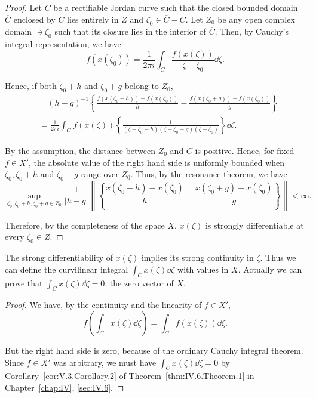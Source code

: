 \begin{proof}
 Let $C$ be a rectifiable Jordan curve such that the closed bounded domain $\overline{C}$ enclosed by $C$ lies entirely in $Z$ and $\zeta_0 \in \overline{C} - C$. Let $Z_0$ be any open complex domain $\ni \zeta_0$ such that its closure lies in the interior of $\overline{C}$. Then, by Cauchy's integral representation, we have 
\[
f (x (\zeta_{0})) = \frac {1}{2 \pi i} \int_{C} \frac {f (x (\zeta))}{\zeta - \zeta_{0}} \dd \zeta . \]

Hence, if both $\zeta_0 + h$ and $\zeta_0 + g$ belong to $Z_0$, 
\[
\begin{aligned}
&\quad (h - g) ^{-1} \left\{\frac {f (x (\zeta_{0} + h)) - f (x (\zeta_{0}))}{h} - \frac {f (x (\zeta_{0} + g)) - f (x (\zeta_{0}))}{g} \right\}
\\
&= \frac {1}{2 \pi i} \int_{G} f (x (\zeta)) \left\{\frac {1}{(\zeta - \zeta_{0} - h) (\zeta - \zeta_{0} - g) (\zeta - \zeta_{0})} \right\} \dd \zeta .
\end{aligned}
\]

By the assumption, the distance between $Z_{0}$ and $C$ is positive. Hence, for fixed $f \in X'$, the absolute value of the right hand side is uniformly bounded when $\zeta_{0}, \zeta_{0} + h$ and $\zeta_{0} + g$ range over $Z_{0}$. Thus, by the resonance theorem, we have 
\[
\sup\limits _ {\zeta_{0}, \zeta_{0} + h, \zeta_{0} + g \in Z _{0}} \frac {1}{| h - g |} \left\| \left\{\frac {x (\zeta_{0} + h) - x (\zeta_{0})}{h} - \frac {x (\zeta_{0} + g) - x (\zeta_{0})}{g} \right\} \right\| < \infty .
\]

Therefore, by the completeness of the space $X$, $x(\zeta)$ is strongly differentiable at every $\zeta_0 \in Z$. 
\end{proof}

\begin{corollary}\label{cor:V.3.Corollary.1} The strong differentiability of $x(\zeta)$ implies its strong continuity in $\zeta$. Thus we can define the curvilinear integral $\int_{C} x(\zeta) \dd\zeta$ with values in $X$. Actually we can prove that $\int_{C} x(\zeta) \dd\zeta = 0$, the zero vector of $X$. 
\end{corollary}

\begin{proof}
 We have, by the continuity and the linearity of $f \in X'$, 
\[
f \left(\int_{C} x (\zeta) \dd \zeta\right) = \int_{C} f (x (\zeta)) \dd \zeta . \]

But the right hand side is zero, because of the ordinary Cauchy integral theorem. Since $f \in X'$ was arbitrary, we must have $\int_{C} x(\zeta) \dd\zeta = 0$ by Corollary~\ref{cor:V.3.Corollary.2} of Theorem~\ref{thm:IV.6.Theorem.1} in Chapter~\ref{chap:IV}, \ref{sec:IV.6}. 
\end{proof}

